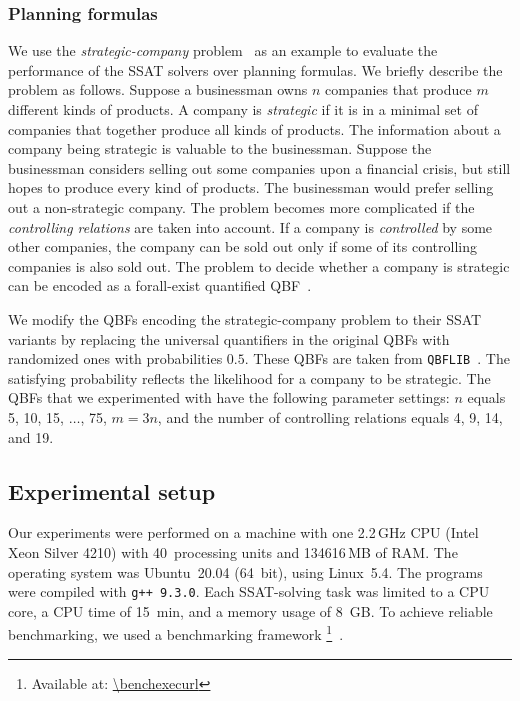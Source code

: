 \subsubsection{Planning formulas}
We use the \textit{strategic-company} problem~\cite{Cadoli1997} as an example
to evaluate the performance of the SSAT solvers over planning formulas.
We briefly describe the problem as follows.
Suppose a businessman owns $n$ companies that produce $m$ different kinds of products.
A company is \textit{strategic} if it is in a minimal set of companies that together produce all kinds of products.
The information about a company being strategic is valuable to the businessman.
Suppose the businessman considers selling out some companies upon a financial crisis,
but still hopes to produce every kind of products.
The businessman would prefer selling out a non-strategic company.
The problem becomes more complicated if the \textit{controlling relations} are taken into account.
If a company is \textit{controlled} by some other companies,
the company can be sold out only if some of its controlling companies is also sold out.
The problem to decide whether a company is strategic can be encoded as a forall-exist quantified QBF~\cite{Faber2005,Leone2006}.

We modify the QBFs encoding the strategic-company problem
to their SSAT variants by replacing the universal quantifiers in the original QBFs
with randomized ones with probabilities $0.5$.
These QBFs are taken from \texttt{QBFLIB}~\cite{Narizzano2006}.
The satisfying probability reflects the likelihood for a company to be strategic.
The QBFs that we experimented with have the following parameter settings:
$n$ equals 5, 10, 15, $\ldots$, 75, $m=3n$,
and the number of controlling relations equals 4, 9, 14, and 19.

\subsection{Experimental setup}
Our experiments were performed on a machine with
one 2.2\,GHz CPU (Intel Xeon Silver 4210) with 40~processing units and 134616\,MB of RAM.
The operating system was Ubuntu~20.04 (64~bit),
using Linux~5.4.
The programs were compiled with \texttt{g++ 9.3.0}.
Each SSAT-solving task was limited to a CPU core,
a CPU time of \SI{15}{min},
and a memory usage of \SI{8}{GB}.
To achieve reliable benchmarking,
we used a benchmarking framework \benchexec\footnote{Available at: \url{\benchexecurl}}~\cite{Benchmarking-STTT}.

